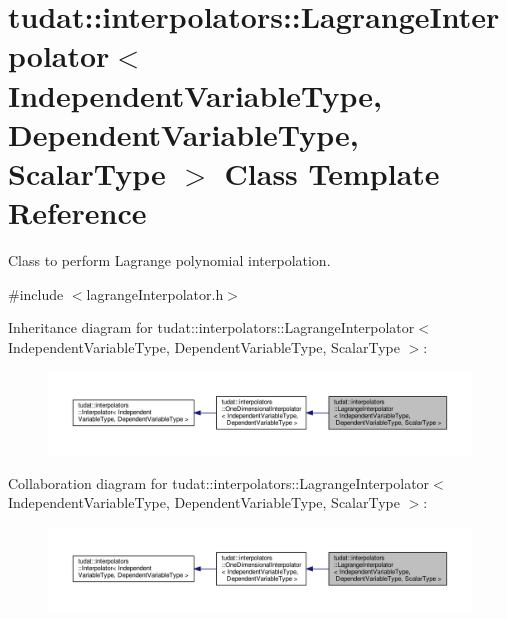 \hypertarget{classtudat_1_1interpolators_1_1LagrangeInterpolator}{}\section{tudat\+:\+:interpolators\+:\+:Lagrange\+Interpolator$<$ Independent\+Variable\+Type, Dependent\+Variable\+Type, Scalar\+Type $>$ Class Template Reference}
\label{classtudat_1_1interpolators_1_1LagrangeInterpolator}


Class to perform Lagrange polynomial interpolation.  




{\ttfamily \#include $<$lagrange\+Interpolator.\+h$>$}



Inheritance diagram for tudat\+:\+:interpolators\+:\+:Lagrange\+Interpolator$<$ Independent\+Variable\+Type, Dependent\+Variable\+Type, Scalar\+Type $>$\+:
\nopagebreak
\begin{figure}[H]
\begin{center}
\leavevmode
\includegraphics[width=350pt]{classtudat_1_1interpolators_1_1LagrangeInterpolator__inherit__graph}
\end{center}
\end{figure}


Collaboration diagram for tudat\+:\+:interpolators\+:\+:Lagrange\+Interpolator$<$ Independent\+Variable\+Type, Dependent\+Variable\+Type, Scalar\+Type $>$\+:
\nopagebreak
\begin{figure}[H]
\begin{center}
\leavevmode
\includegraphics[width=350pt]{classtudat_1_1interpolators_1_1LagrangeInterpolator__coll__graph}
\end{center}
\end{figure}
